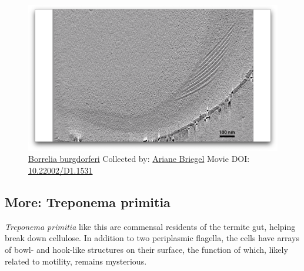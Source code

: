 \documentclass[]{tufte-book}
\begin{document}
\begin{figure}
\includegraphics{movie_stills/6_7} \caption[\protect\hyperlink{tree}{Borrelia burgdorferi} Collected by:
\protect\hyperlink{ariane_briegel}{Ariane Briegel} Movie DOI:
\href{https://doi.org/10.22002/D1.1531}{10.22002/D1.1531}]{\protect\hyperlink{tree}{Borrelia burgdorferi} Collected by:
\protect\hyperlink{ariane_briegel}{Ariane Briegel} Movie DOI:
\href{https://doi.org/10.22002/D1.1531}{10.22002/D1.1531}}\label{fig:6-7}
\end{figure}

\hypertarget{Treponema_primitia}{\subsection*{More: Treponema
primitia}\label{Treponema_primitia}}

\emph{Treponema primitia} like this are commensal residents of the
termite gut, helping break down cellulose. In addition to two
periplasmic flagella, the cells have arrays of bowl- and hook-like
structures on their surface, the function of which, likely related to
motility, remains mysterious.
\end{document}

